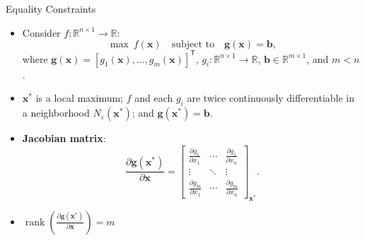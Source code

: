 \documentclass[aspectratio=169,hyperref,UTF8,CJK]{beamer}
\newcommand{\R}{\mathbb{R}}
\newcommand{\trans}{\mathsf{T}}
\newcommand{\vect}[1]{\boldsymbol{#1}}
\begin{document}
\begin{frame}{Equality Constraints}
  \scriptsize
  \begin{itemize}
    \item Consider $f:\R^{n\times1}\to\R$:
      \begin{equation*}
        \max\ f(\vect{x})\quad\text{subject to}\quad\vect{g}(\vect{x})=\vect{b},
      \end{equation*}
      where $\vect{g}(\vect{x})=[g_1(\vect{x}),\ldots,g_m(\vect{x})]^{\trans}$,
      $g_i:\R^{n\times1}\to\R$, $\vect{b}\in\R^{m\times1}$, and $m<n$.
    \item $\vect{x}^{*}$ is a local maximum; $f$ and each $g_i$ are twice continuously differentiable in a neighborhood $N_{\varepsilon}(\vect{x}^{*})$; and $\vect{g}(\vect{x}^{*})=\vect{b}$.
    \item \textbf{Jacobian matrix}:
      \begin{equation*}
        \frac{\partial\vect{g}(\vect{x}^{*})}{\partial\vect{x}}
        =\begin{bmatrix}
        \frac{\partial g_1}{\partial x_1}&\cdots&\frac{\partial g_1}{\partial x_n}\\
        \vdots&\ddots&\vdots\\
        \frac{\partial g_m}{\partial x_1}&\cdots&\frac{\partial g_m}{\partial x_n}
        \end{bmatrix}_{\vect{x}^{*}}.
      \end{equation*}
    \item $\operatorname{rank}\left(\frac{\partial\vect{g}(\vect{x}^{*})}{\partial\vect{x}}\right)=m$
  \end{itemize}
\end{frame}
\end{document}
